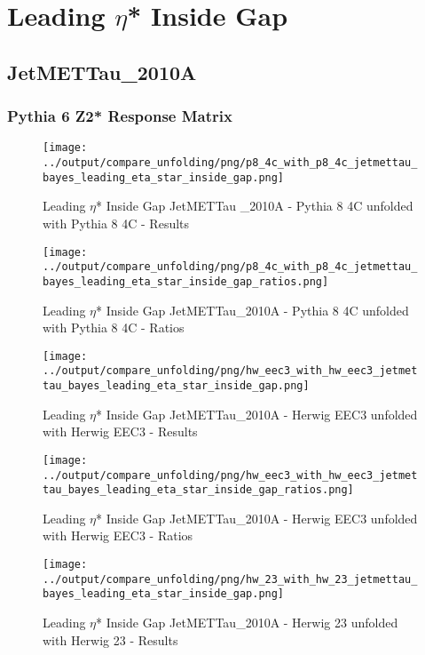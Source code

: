 \documentclass[11pt]{book}
\begin{document}
\newpage
\chapter{Leading $\eta$* Inside Gap}
\section{JetMETTau\_2010A}
\subsection{Pythia 6 Z2* Response Matrix}


\begin{figure}[ht]
\centering
\texttt{[image: ../output/compare\_unfolding/png/p8\_4c\_with\_p8\_4c\_jetmettau\_bayes\_leading\_eta\_star\_inside\_gap.png]}
\caption{Leading $\eta$* Inside Gap JetMETTau \_2010A - Pythia 8 4C unfolded with Pythia 8 4C - Results}
\label{p8_p8_jetmettau_bayes_leading_eta_star_inside_gap_a}
\end{figure}

\begin{figure}[ht]
\centering
\texttt{[image: ../output/compare\_unfolding/png/p8\_4c\_with\_p8\_4c\_jetmettau\_bayes\_leading\_eta\_star\_inside\_gap\_ratios.png]}
\caption{Leading $\eta$* Inside Gap JetMETTau\_2010A - Pythia 8 4C unfolded with Pythia 8 4C - Ratios}
\label{p8_p8_jetmettau_bayes_leading_eta_star_inside_gap_b}
\end{figure}

\begin{figure}[ht]
\centering
\texttt{[image: ../output/compare\_unfolding/png/hw\_eec3\_with\_hw\_eec3\_jetmettau\_bayes\_leading\_eta\_star\_inside\_gap.png]}
\caption{Leading $\eta$* Inside Gap JetMETTau\_2010A - Herwig EEC3 unfolded with Herwig EEC3 - Results}
\label{hw_eec3_hw_eec3_jetmettau_bayes_leading_eta_star_inside_gap_a}
\end{figure}

\begin{figure}[ht]
\centering
\texttt{[image: ../output/compare\_unfolding/png/hw\_eec3\_with\_hw\_eec3\_jetmettau\_bayes\_leading\_eta\_star\_inside\_gap\_ratios.png]}
\caption{Leading $\eta$* Inside Gap JetMETTau\_2010A - Herwig EEC3 unfolded with Herwig EEC3 - Ratios}
\label{hw_eec3_hw_eec3_jetmettau_bayes_leading_eta_star_inside_gap_b}
\end{figure}

\begin{figure}[ht]
\centering
\texttt{[image: ../output/compare\_unfolding/png/hw\_23\_with\_hw\_23\_jetmettau\_bayes\_leading\_eta\_star\_inside\_gap.png]}
\caption{Leading $\eta$* Inside Gap JetMETTau\_2010A - Herwig 23 unfolded with Herwig 23 - Results}
\label{hw_23_hw_23_jetmettau_bayes_leading_eta_star_inside_gap_a}
\end{figure}
\end{document}
